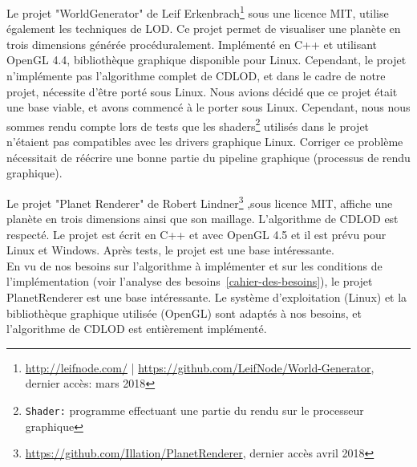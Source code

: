 Le projet "WorldGenerator" de Leif
Erkenbrach\footnote{\url{http://leifnode.com/} |
\url{https://github.com/LeifNode/World-Generator}, dernier accès: mars
2018} sous une licence MIT, utilise également les techniques de LOD. Ce projet permet de visualiser une planète en
trois dimensions générée procéduralement. Implémenté en C++ et utilisant
OpenGL 4.4, bibliothèque graphique disponible pour Linux. Cependant, le
projet n'implémente pas l'algorithme complet de CDLOD, et dans le cadre de notre projet, nécessite
d'être porté sous Linux. Nous avions décidé que ce projet était une base
viable, et avons commencé à le porter sous Linux. Cependant, nous nous
sommes rendu compte lors de tests que les
shaders\footnote{\texttt{Shader:} programme effectuant une partie du
rendu sur le processeur graphique} utilisés dans le projet
n'étaient pas compatibles avec les drivers graphique Linux.  Corriger ce
problème nécessitait de réécrire une bonne partie du pipeline graphique
(processus de rendu graphique). 

Le projet "Planet Renderer" de Robert
Lindner\footnote{\url{https://github.com/Illation/PlanetRenderer},
dernier accès avril 2018} ,sous licence MIT, affiche une
planète en trois dimensions ainsi que son maillage. L'algorithme de
CDLOD est respecté. Le projet est écrit en C++ et avec OpenGL 4.5 et il
est prévu pour Linux et Windows. Après tests, le projet est une base
intéressante.\\ 

En vu de nos besoins sur l'algorithme à implémenter et sur les
conditions de l'implémentation (voir l'analyse des
besoins~\ref{cahier-des-besoins}), le projet PlanetRenderer est une base
intéressante. Le système d'exploitation (Linux) et la bibliothèque
graphique utilisée (OpenGL) sont adaptés à nos besoins, et l'algorithme
de CDLOD est entièrement implémenté.
